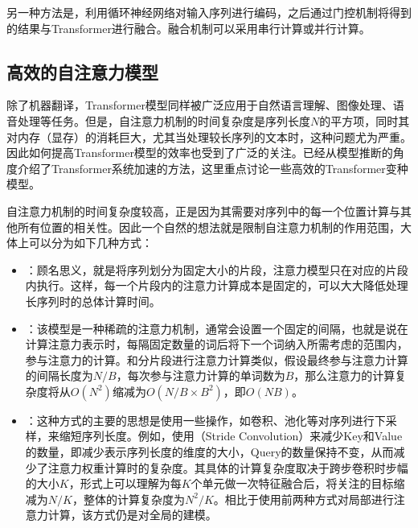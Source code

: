\parinterval 另一种方法是，利用循环神经网络对输入序列进行编码，之后通过门控机制将得到的结果与Transformer进行融合。融合机制可以采用串行计算或并行计算。


\subsection{高效的自注意力模型}

\parinterval 除了机器翻译，Transformer模型同样被广泛应用于自然语言理解、图像处理、语音处理等任务。但是，自注意力机制的时间复杂度是序列长度$N$的平方项，同时其对内存（显存）的消耗巨大，尤其当处理较长序列的文本时，这种问题尤为严重。因此如何提高Transformer模型的效率也受到了广泛的关注。{\chapterfourteen}已经从模型推断的角度介绍了Transformer系统加速的方法，这里重点讨论一些高效的Transformer变种模型。

\parinterval 自注意力机制的时间复杂度较高，正是因为其需要对序列中的每一个位置计算与其他所有位置的相关性。因此一个自然的想法就是限制自注意力机制的作用范围，大体上可以分为如下几种方式：

\begin{itemize}
\vspace{0.5em}
\item {\small{}}：顾名思义，就是将序列划分为固定大小的片段，注意力模型只在对应的片段内执行。这样，每一个片段内的注意力计算成本是固定的，可以大大降低处理长序列时的总体计算时间。
\vspace{0.5em}
\item {\small{}}：该模型是一种稀疏的注意力机制，通常会设置一个固定的间隔，也就是说在计算注意力表示时，每隔固定数量的词后将下一个词纳入所需考虑的范围内，参与注意力的计算。和分片段进行注意力计算类似，假设最终参与注意力计算的间隔长度为$N/B$，每次参与注意力计算的单词数为$B$，那么注意力的计算复杂度将从$O(N^2)$缩减为$O(N/B \times B^2)$，即$O(NB)$。
\vspace{0.5em}
\item {\small{}}：这种方式的主要的思想是使用一些操作，如卷积、池化等对序列进行下采样，来缩短序列长度。例如，使用{\small{}}（Stride Convolution）来减少Key和Value的数量，即减少表示序列长度的维度的大小，Query的数量保持不变，从而减少了注意力权重计算时的复杂度。其具体的计算复杂度取决于跨步卷积时步幅的大小$K$，形式上可以理解为每$K$个单元做一次特征融合后，将关注的目标缩减为$N/K$，整体的计算复杂度为$N^2/K$。相比于使用前两种方式对局部进行注意力计算，该方式仍是对全局的建模。
\vspace{0.5em}
\end{itemize}

